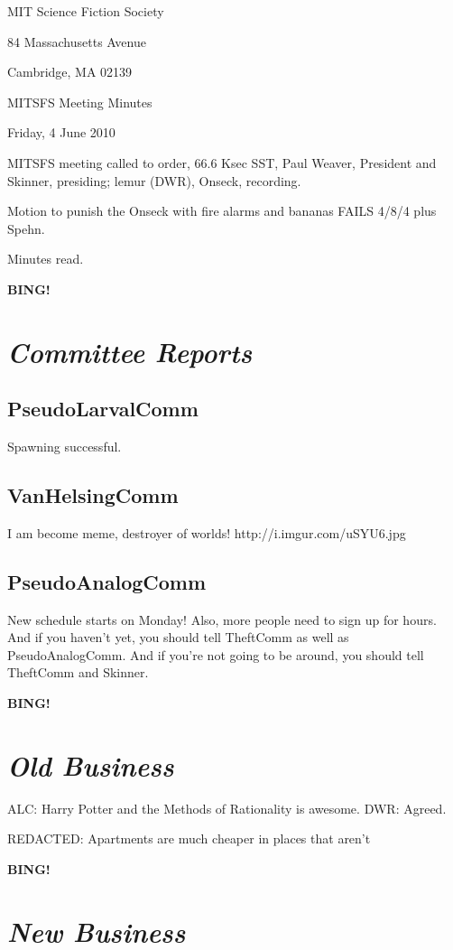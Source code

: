 \documentclass[10pt]{article}
\newcommand{\bing}{{\bf BING!} }
\newcommand{\goto}[1]{\bing \vskip 12pt \section*{{\em{#1}}}}
\newcommand{\ps}{ plus Spehn\xspace}
\newcommand{\skinner}{Paul Weaver, President and Skinner}
\newcommand{\onseck}{lemur (DWR), Onseck}
\newcommand{\meetingdate}{Friday, 4 June 2010}
\begin{document}
\begin{center}

MIT Science Fiction Society

84 Massachusetts Avenue

Cambridge, MA 02139

\vspace{12pt}

MITSFS Meeting Minutes

\meetingdate

\end{center}

\vspace{18pt}

\setlength{\parskip}{6pt}

\noindent
MITSFS meeting called to order, 66.6 Ksec SST,
\skinner, presiding; \onseck, recording.

Motion to punish the Onseck with fire alarms and bananas FAILS 4/8/4\ps.

Minutes read.

\goto{Committee Reports}

\subsection*{PseudoLarvalComm}

Spawning successful.

\subsection*{VanHelsingComm}

I am become meme, destroyer of worlds!
http://i.imgur.com/uSYU6.jpg

\subsection*{PseudoAnalogComm}

New schedule starts on Monday!  Also, more people need to sign up for hours.  And if you haven't yet, you should tell TheftComm as well as PseudoAnalogComm.  And if you're not going to be around, you should tell TheftComm and Skinner.

\goto{Old Business}

ALC: Harry Potter and the Methods of Rationality is awesome.
DWR: Agreed.

REDACTED: Apartments are much cheaper in places that aren't 

\goto{New Business}
\end{document}
